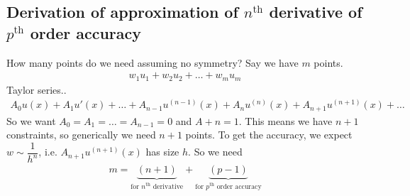 \documentclass{article}
\begin{document}
        \subsection{Derivation of approximation of $n^{\text{th}}$ derivative of $p^\text{th}$ order accuracy}
            How many points do we need assuming no symmetry?  Say we have $m$ points.
            \begin{align}
                w_1u_1 + w_2u_2 + \dots + w_mu_m
            \end{align}
            Taylor series..
            \begin{align}
                A_0u(x) + A_1u'(x) + \dots + A_{n-1}u^{(n-1)}(x) + A_nu^{(n)}(x) + A_{n+1}u^{(n+1)}(x) + \dots
            \end{align}
            So we want $A_0 = A_1 = \dots = A_{n-1} = 0$ and $A+n = 1$.  This means we have $n+1$ constraints, so generically we need $n+1$ points.  To get the accuracy, we expect $w \sim \dfrac{1}{h^n}$, i.e. $A_{n+1}u^{(n+1)}(x)$ has size $h$.  So we need
            \begin{align}
                m = \underbrace{(n + 1)}_\text{for $n^{\text{th}}$ derivative} + \underbrace{(p - 1)}_{\text{for $p^\text{th}$ order accuracy}}
            \end{align}
\end{document}

